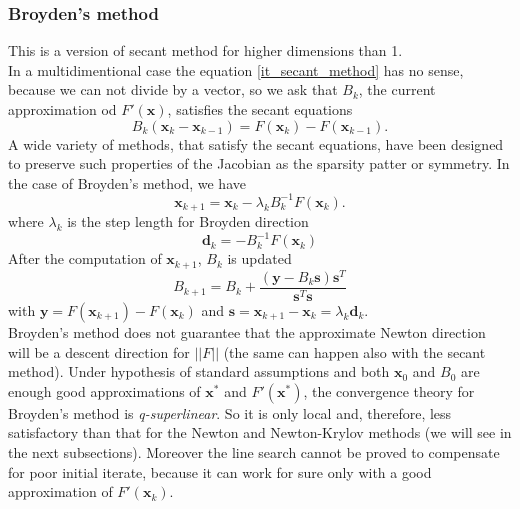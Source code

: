  \subsubsection{Broyden's method}This is a version of secant method for higher dimensions than 1.\\
In a multidimentional case the equation \eqref{it_secant_method} has no sense, because we can not divide by a vector, so we ask that ${B}_{k}$, the current approximation od $F'(\textbf{x})$, satisfies the secant equations 
\begin{equation*}
{B}_{k}({\textbf{x}}_{k} - {\textbf{x}}_{k-1}) = F({\textbf{x}}_{k}) - F({\textbf{x}}_{k-1}).  
\end{equation*} 
A wide variety of methods, that satisfy the secant equations, have been designed to preserve such properties of the Jacobian as the sparsity patter or symmetry. In the case of Broyden's method, we have
\begin{equation*}
{\textbf{x}}_{k+1} = {\textbf{x}}_{k} - {\lambda}_{k}{B}_{k}^{-1}F({\textbf{x}}_{k}).  
\end{equation*} 
where ${\lambda}_{k}$ is the step length for Broyden direction
\begin{equation*}
{\textbf{d}}_{k} = -{B}_{k}^{-1}F({\textbf{x}}_{k})  
\end{equation*} 
After the computation of ${\textbf{x}}_{k+1}$, ${B}_{k}$ is updated 
\begin{equation*}
{B}_{k+1} = {B}_{k} + \frac{(\textbf{y} - {B}_{k}\textbf{s}){\textbf{s}}^{T}}{{\textbf{s}}^{T}\textbf{s}}  
\end{equation*} 
with $\textbf{y} = F({\textbf{x}}_{k+1}) - F({\textbf{x}}_{k})$ and $ \textbf{s} = {\textbf{x}}_{k+1}-{\textbf{x}}_{k} = {\lambda}_{k}{\textbf{d}}_{k} $.\\
Broyden's method does not guarantee that the approximate Newton direction will be a descent direction for $||F||$  (the same can happen also with the secant method).
Under hypothesis of standard assumptions and both ${\textbf{x}}_{0}$ and ${B}_{0}$ are enough good approximations of $ \textbf{x}^* $ and $ F'(\textbf{x}^*) $, the convergence theory for Broyden's method is \textit{q-superlinear}. So it is only local and, therefore, less satisfactory than that for the Newton and Newton-Krylov methods (we will see in the next subsections). Moreover the line search cannot be proved to compensate for poor initial iterate, because it can work for sure only with a good approximation of $F'({\textbf{x}}_{k})$.
\\
